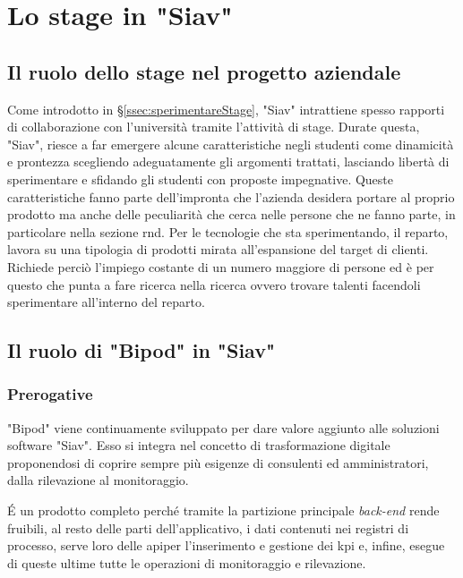 
\chapter{Lo stage in "Siav"}
\label{cap:process-mining}
\section{Il ruolo dello stage nel progetto aziendale}
Come introdotto in \S\ref{ssec:sperimentareStage}, "Siav" intrattiene spesso rapporti di collaborazione con l'università tramite l'attività di stage.
Durate questa, "Siav", riesce a far emergere alcune caratteristiche negli studenti come dinamicità e prontezza scegliendo adeguatamente gli argomenti trattati, lasciando libertà di sperimentare e sfidando gli studenti con proposte impegnative.
Queste caratteristiche fanno parte dell'impronta che l'azienda desidera portare al proprio prodotto ma anche delle peculiarità che cerca nelle persone che ne fanno parte, in particolare nella sezione \acrshort{rnd}.
Per le tecnologie che sta sperimentando, il reparto, lavora su una tipologia di prodotti mirata all'espansione del target di clienti. Richiede perciò l'impiego costante di un numero maggiore di persone ed è per questo che punta a fare ricerca nella ricerca ovvero trovare talenti facendoli sperimentare all'interno del reparto.
\section{Il ruolo di "Bipod" in "Siav"}
\subsection{Prerogative}
"Bipod" viene continuamente sviluppato per dare valore aggiunto alle soluzioni software "Siav". Esso si integra nel concetto di trasformazione digitale proponendosi di coprire sempre più esigenze di consulenti ed amministratori, dalla rilevazione al monitoraggio.

\'E un prodotto completo perché tramite la partizione principale \textit{back-end} rende fruibili, al resto delle parti dell'applicativo, i dati contenuti nei registri di processo, serve loro delle \acrshort{api}\glsfirstoccur per l'inserimento e gestione dei \acrshort{kpi} e, infine, esegue di queste ultime tutte le operazioni di monitoraggio e rilevazione.

